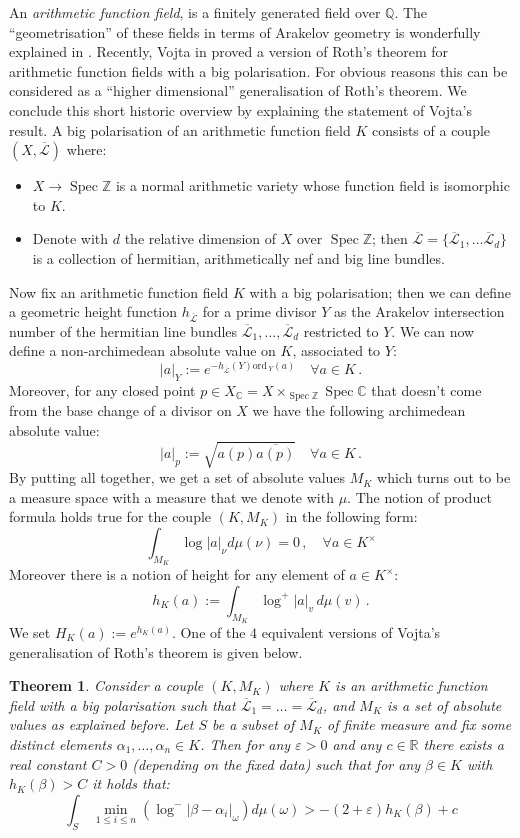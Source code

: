 \documentclass[10 pt,a4paper]{article}
\theoremstyle{plain}
\newtheorem{thm}{Theorem}[section]
\theoremstyle{definition}
\theoremstyle{named}
\newcommand{\ord}{\mathrm{ord}\,}
\DeclareMathOperator{\spec}{Spec}
\begin{document}
An \emph{arithmetic function field},  is a  finitely generated field over $\mathbb Q$. The ``geometrisation'' of these fields in terms of Arakelov geometry is wonderfully explained in \cite{Mor}. Recently,  Vojta in \cite{vo} proved a version of Roth's theorem for arithmetic function fields with a big polarisation. For obvious reasons this can be considered as a ``higher dimensional'' generalisation of Roth's theorem.  We  conclude this short historic overview by explaining the statement of Vojta's  result. A big polarisation of an arithmetic function field  $K$  consists of a couple $(X,\overline{\mathcal L})$ where:
\begin{itemize}
\item[$(i)$]$X\to \spec\mathbb Z$ is a normal arithmetic variety whose function field is isomorphic to $K$.
\item[$(ii)$] Denote with $d$ the relative dimension of $X$ over  $\spec\mathbb Z$; then $\overline{\mathcal L}=\{\overline{\mathscr L}_1,\ldots\overline{\mathscr L}_d\}$  is a collection of hermitian, arithmetically nef and big line bundles.
\end{itemize}
Now  fix an arithmetic function field  $K$ with a big polarisation; then we can define a geometric height function $h_{\overline{\mathcal L}}$ for a prime divisor $Y$ as the Arakelov intersection number of the hermitian  line bundles $\overline{\mathscr L}_1,\ldots,\overline{\mathscr L}_d$ restricted to $Y$. We can now define a non-archimedean absolute value on $K$, associated to $Y$:
$$\vert a\vert_Y:=e^{-h_{\overline{\mathcal L}}(Y)\ord_Y(a)}\quad\forall a\in K\,.$$
Moreover, for any closed point $p
\in X_{\mathbb C}=X\times_{\spec\mathbb Z}\spec \mathbb C$ that doesn't come from the base change of a divisor on $X$ we have the following archimedean absolute value:
$$|a|_p:=\sqrt{a(p)\overline {a(p)}}\quad\forall a\in K\,.$$
By putting all together, we get a set of absolute values $M_K$ which turns out to be a measure space with a measure that we denote with $\mu$. The notion of  product formula holds true for the couple $(K, M_K)$ in the following form:
$$\int_{M_K}\log \vert a\vert_\nu d\mu(\nu)=0\,,\quad\forall a\in K^\times$$
Moreover there is a notion of height for any element of $a\in K^\times$:
$$
h_{K}(a):=\int_{M_K} \log^+|a|_{v}\, d\mu(v)\,.
$$
We set $H_K(a):=e^{h_{K}(a)}$. One of the $4$ equivalent versions of Vojta's generalisation of Roth's theorem is given below.
\begin{thm}\cite[Theorem 4.5]{vo}\label{vojta}
Consider a couple $(K,M_K)$ where $K$ is an arithmetic function field with a big polarisation such that $\overline{\mathscr L}_1=\ldots=\overline{\mathscr L}_d$, and $M_K$ is a set of absolute values as explained before. Let $S$ be a subset of $M_K$ of finite measure and fix some distinct elements $\alpha_1,\dots ,\alpha_n\in  K$. Then for any $\varepsilon>0$ and any $c\in\mathbb R$ there exists a real constant $C>0$ (depending on the fixed data) such that for any $\beta\in  K$  with  $h_{K}(\beta)>C$   
it holds that:
\begin{equation}\label{our_roth_encore}
\int_{S}\,\min_{1\le i\le n}\left(\log^-\vert \beta-\alpha_i\vert_\omega\right) d\mu(\omega)>-(2+\varepsilon)h_K(\beta)+c
\end{equation}
\end{thm}
\end{document}
